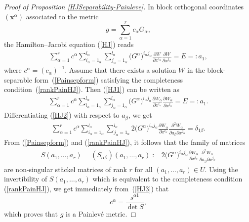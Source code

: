 \documentclass[pdftex]{sigma}
\numberwithin{equation}{section}
\newcommand{\ialpha}{i_{\alpha}}
\newcommand{\jalpha}{j_{\alpha}}
\newcommand{\lalpha}{l_{\alpha}}
\begin{document}
\begin{proof}[Proof of Proposition \ref{HJSeparability-Painleve}]

In block orthogonal coordinates $(\textbf{x}^\alpha)$ associated to the metric
\[
 g = \sum_{\alpha = 1}^r c_\alpha G_\alpha,
\]
the Hamilton--Jacobi equation (\ref{HJ}) reads
\begin{gather} \label{HJ1}
 \sum_{\alpha =1}^{r} c^\alpha \sum_{\ialpha =1_{\alpha}}^{\lalpha}\sum_{\jalpha =1_{\alpha}}^{\lalpha} \big(G^{\alpha}\big)^{\ialpha \jalpha}\frac{\partial W}{\partial x^{\ialpha} }\frac{\partial W}{\partial x^{\jalpha}}=E=:a_{1},
\end{gather}
where $c^\alpha = (c_\alpha)^{-1}$. Assume that there exists a solution $W$ in the block-separable form~(\ref{Painsepform}) satisfying the completeness condition~(\ref{rankPainHJ}). Then (\ref{HJ1}) can be written as
\begin{gather} \label{HJ2}
 \sum_{\alpha =1}^{r} c^\alpha \sum_{\ialpha =1_{\alpha}}^{\lalpha}\sum_{\jalpha =1_{\alpha}}^{\lalpha} \big(G^{\alpha}\big)^{\ialpha \jalpha}\frac{\partial W_\alpha}{\partial x^{\ialpha} }\frac{\partial W_\alpha}{\partial x^{\jalpha}}=E=:a_{1}.
\end{gather}
Differentiating (\ref{HJ2}) with respect to $a_\beta$, we get
\begin{gather} \label{HJ3}
 \sum_{\alpha =1}^{r} c^\alpha \sum_{\ialpha =1_{\alpha}}^{\lalpha}\sum_{\jalpha =1_{\alpha}}^{\lalpha} 2 \big(G^{\alpha}\big)^{\ialpha \jalpha}\frac{\partial W_\alpha}{\partial x^{\ialpha} } \frac{\partial^2 W_\alpha}{\partial a_\beta \partial x^{\jalpha}} = \delta_{1\beta} .
\end{gather}
From (\ref{Painsepform}) and (\ref{rankPainHJ}), it follows that the family of matrices
\begin{gather*} %
 S(a_1,\dots,a_r) = (S_{\alpha \beta})(a_1,\dots,a_r) := 2 \big(G^{\alpha}\big)^{\ialpha \jalpha}\frac{\partial W_\alpha}{\partial x^{\ialpha} } \frac{\partial^2 W_\alpha}{\partial a_\beta \partial x^{\jalpha}}
\end{gather*}
are non-singular st\"ackel matrices of rank $r$ for all $(a_1,\dots,a_r) \in U$. Using the invertibility of $S(a_1,\dots,a_r)$ which is equivalent to the completeness condition (\ref{rankPainHJ}), we get immediately from~(\ref{HJ3}) that
\[
 c^\alpha = \frac{s^{\alpha 1}}{\det S},
\]
which proves that $g$ is a Painlev\'e metric.


\end{proof}
\end{document}
